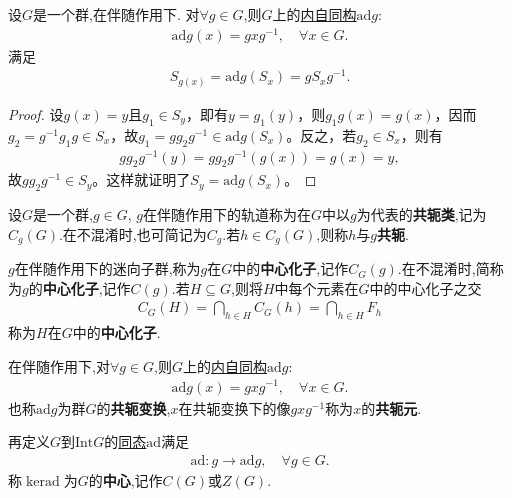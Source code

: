\documentclass[../../main.tex]{subfiles}%
\begin{document}
\begin{theorem}\label{theorem:伴随作用下ad的定义}
设$G$是一个群,在伴随作用下.
对$\forall g\in G$,则$G$上的\hyperref[theorem:内自同构群及其基本性质-2]{内自同构}$\text{ad}g$:
\begin{align}\label{eq::--whiruhfeu8f2389jiosEAFgfeg}
\text{ad}g(x) = gxg^{-1}, \quad \forall x \in G.
\end{align}
满足
\begin{align*}
S_{g(x)} = \text{ad}g(S_x) = gS_xg^{-1}.
\end{align*}
\end{theorem}
\begin{proof}

设$g(x) = y$且$g_1 \in S_y$，即有$y = g_1(y)$，则$g_1g(x) = g(x)$，因而$g_2 = g^{-1}g_1g \in S_x$，故$g_1 = gg_2g^{-1} \in \text{ad}g(S_x)$。反之，若$g_2 \in S_x$，则有
\begin{align*}
gg_2g^{-1}(y) = gg_2g^{-1}(g(x)) = g(x) = y,
\end{align*}
故$gg_2g^{-1} \in S_y$。这样就证明了$S_y = \text{ad}g(S_x)$。

\end{proof}

\begin{definition}\label{definition:共轭和中心化子定义}
设$G$是一个群,$g \in G$, $g$在伴随作用下的轨道称为在$G$中以$g$为代表的\textbf{共轭类},记为$C_g(G)$.在不混淆时,也可简记为$C_g$.若$h \in C_g(G)$,则称$h$与$g$\textbf{共轭}.

$g$在伴随作用下的迷向子群,称为$g$在$G$中的\textbf{中心化子},记作$C_G(g)$.在不混淆时,简称为$g$的\textbf{中心化子},记作$C(g)$.若$H\subseteq G$,则将$H$中每个元素在$G$中的中心化子之交
\begin{align*}
C_G\left( H \right) =\bigcap_{h\in H}{C_G\left( h \right)}=\bigcap_{h\in H}{F_h}
\end{align*}
称为$H$在$G$中的\textbf{中心化子}.

在伴随作用下,对$\forall g\in G$,则$G$上的\hyperref[theorem:内自同构群及其基本性质-2]{内自同构}$\text{ad}g$:
\begin{align*}
\text{ad}g(x) = gxg^{-1}, \quad \forall x \in G.
\end{align*}
也称$\text{ad}g$为群$G$的\textbf{共轭变换},$x$在共轭变换下的像$gxg^{-1}$称为$x$的\textbf{共轭元}.

再定义$G$到$\text{Int}G$的\hyperref[theorem:内自同构群及其基本性质-4]{同态}$\text{ad}$满足
\begin{align*}
\text{ad}:g \to \text{ad}g,\quad \forall g\in G.
\end{align*}
称$\ker \text{ad}$为$G$的\textbf{中心},记作$C(G)$或$Z(G)$.
\end{definition}
\end{document}
